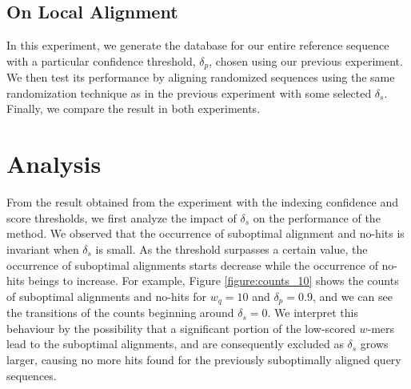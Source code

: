\documentclass{article}
\begin{document}
\subsection{On Local Alignment}

In this experiment, we generate the database for our entire reference sequence with a particular confidence threshold, $\delta_p$, chosen using our previous experiment. We then test its performance by aligning randomized sequences using the same randomization technique as in the previous experiment with some selected $\delta_s$. Finally, we compare the result in both experiments. 

\section{Analysis}

From the result obtained from the experiment with the indexing confidence and score thresholds, we first analyze the impact of $\delta_s$ on the performance of the method. We observed that the occurrence of suboptimal alignment and no-hits is invariant when $\delta_s$ is small. As the threshold surpasses a certain value, the occurrence of suboptimal alignments starts decrease while the occurrence of no-hits beings to increase. For example, Figure \ref{figure:counts_10} shows the counts of suboptimal alignments and no-hits for $w_q = 10$ and $\delta_p = 0.9$, and we can see the transitions of the counts beginning around $\delta_s = 0$. We interpret this behaviour by the possibility that a significant portion of the low-scored $w$-mers lead to the suboptimal alignments, and are consequently excluded as $\delta_s$ grows larger, causing no more hits found for the previously suboptimally aligned query sequences. 
\end{document}
